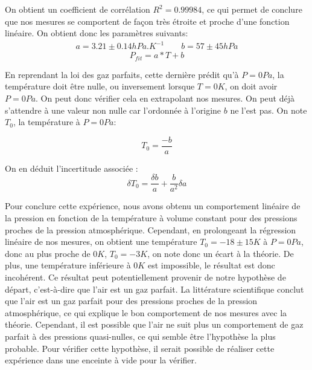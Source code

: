 \documentclass[12pt]{article}
\begin{document}
On obtient un coefficient de corrélation $R^2 = 0.99984$, ce qui permet de conclure que nos mesures se comportent de façon très étroite et proche d'une fonction linéaire. On obtient donc les paramètres suivants:
\begin{align*}
	a = 3.21 \pm 0.14 hPa.K^{-1} \quad \quad b = 57 \pm 45 hPa
\end{align*}
\begin{equation*}
	P_{fit} = a * T + b
\end{equation*}

En reprendant la loi des gaz parfaits, cette dernière prédit qu'à $P = 0Pa$, la température doit être nulle, ou inversement lorsque $T = 0K$, on doit avoir $P=0Pa$. On peut donc vérifier cela
en extrapolant nos mesures. On peut déjà s'attendre à une valeur non nulle car l'ordonnée à l'origine $b$ ne l'est pas. On note $T_0$, la température à $P=0Pa$:

\begin{equation}
	T_0 = \frac{-b}{a}
\end{equation}

On en déduit l'incertitude associée :
\begin{equation}
	\delta T_0 = \frac{\delta b}{a} + \frac{b}{a^2} \delta a
\end{equation}

\newpage
Pour conclure cette expérience, nous avons obtenu un comportement linéaire de la pression en fonction de la température à volume constant pour des pressions proches de la pression atmosphérique.
Cependant, en prolongeant la régression linéaire de nos mesures, on obtient une température $T_0 = -18 \pm 15 K$ à $P=0Pa$, donc au plus proche de $0K$, $T_0 = -3K$, on note donc un écart à la théorie.
De plus, une température inférieure à $0K$ est impossible, le résultat est donc incohérent. Ce résultat peut potentiellement provenir de notre hypothèse de départ, c'est-à-dire que l'air est un gaz parfait. 
La littérature scientifique conclut que l'air est un gaz parfait pour des pressions proches de la pression atmosphérique, ce qui explique le bon comportement
de nos mesures avec la théorie. Cependant, il est possible que l'air ne suit plus un comportement de gaz parfait à des pressions quasi-nulles, ce qui semble être l'hypothèse la plus probable. 
Pour vérifier cette hypothèse, il serait possible de réaliser cette expérience dans une enceinte à vide pour la vérifier. 

\newpage
\end{document}
